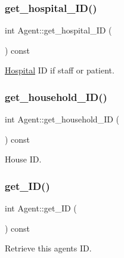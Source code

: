 \subsubsection{\texorpdfstring{get\+\_\+hospital\+\_\+\+I\+D()}{get\_hospital\_ID()}}
{\footnotesize\ttfamily int Agent\+::get\+\_\+hospital\+\_\+\+ID (\begin{DoxyParamCaption}{ }\end{DoxyParamCaption}) const\hspace{0.3cm}{\ttfamily [inline]}}



\hyperlink{classHospital}{Hospital} ID if staff or patient. 

\mbox{\label{classAgent_a67330abc8e8a042e538ee32fae1c5d1c}} 
\subsubsection{\texorpdfstring{get\+\_\+household\+\_\+\+I\+D()}{get\_household\_ID()}}
{\footnotesize\ttfamily int Agent\+::get\+\_\+household\+\_\+\+ID (\begin{DoxyParamCaption}{ }\end{DoxyParamCaption}) const\hspace{0.3cm}{\ttfamily [inline]}}



House ID. 

\mbox{\label{classAgent_a62a2d0e19950f7ae9552a3081ced2b29}} 
\subsubsection{\texorpdfstring{get\+\_\+\+I\+D()}{get\_ID()}}
{\footnotesize\ttfamily int Agent\+::get\+\_\+\+ID (\begin{DoxyParamCaption}{ }\end{DoxyParamCaption}) const\hspace{0.3cm}{\ttfamily [inline]}}



Retrieve this agents ID. 

\mbox{\label{classAgent_abf59cadd5a25de00fdcfd404cf6aba6d}} 
